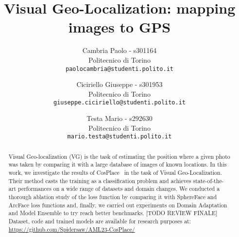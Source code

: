 \documentclass[10pt,twocolumn,letterpaper]{article}
\begin{document}
\title{Visual Geo-Localization:
mapping images to GPS}

\author{Cambria Paolo - s301164\\
Politecnico di Torino\\
{\tt\small paolocambria@studenti.polito.it}
\and
Ciciriello Giuseppe - s301953\\
Politecnico di Torino\\
{\tt\small giuseppe.ciciriello@studenti.polito.it}
\and
Testa Mario - s292630\\
Politecnico di Torino\\
{\tt\small mario.testa@studenti.polito.it}
}

\maketitle

\begin{abstract}
Visual Geo-localization (VG) is the task of estimating the position where a given photo was taken by comparing it with a large database of images of known locations.
In this work, we investigate the results of CosPlace~\cite{Berton_CVPR_2022_CosPlace} in the task of Visual Geo-Localization. Their method casts the training as a classification problem and achieves state-of-the-art performances on a wide range of datasets and domain changes. We conducted a thorough ablation study of the loss function by comparing it with SphereFace and ArcFace loss functions and, finally, we carried out experiments on Domain Adaptation and Model Ensemble to try reach better benchmarks.
[TODO REVIEW FINALE]
Dataset, code and trained models are available for research purposes at: \newline
\url{https://github.com/Spidersaw/AML23-CosPlace/}
\end{abstract}


\end{document}
